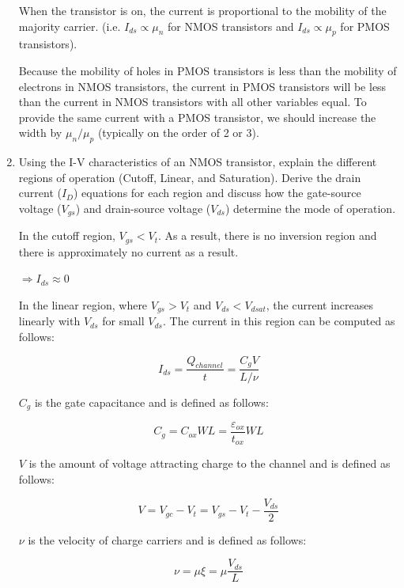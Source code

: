 \documentclass[fleqn]{article}
\begin{document}
\begin{enumerate}
		When the transistor is on, the current is proportional to the mobility of the majority carrier. (i.e. $I_{ds} \propto \mu_n$ for NMOS transistors and $I_{ds} \propto \mu_p$ for PMOS transistors).
		
		Because the mobility of holes in PMOS transistors is less than the mobility of electrons in NMOS transistors, the current in PMOS transistors will be less than the current in NMOS transistors with all other variables equal. To provide the same current with a PMOS transistor, we should increase the width by $\mu_n/\mu_p$ (typically on the order of 2 or 3).
		
		\item Using the I-V characteristics of an NMOS transistor, explain the different regions of operation (Cutoff, Linear, and Saturation). Derive the drain current ($I_D$) equations for each region and discuss how the gate-source voltage ($V_{gs}$) and drain-source voltage ($V_{ds}$) determine the mode of operation. 

		In the cutoff region, $V_{gs} < V_t$. As a result, there is no inversion region and there is approximately no current as a result.
		
		$\Rightarrow I_{ds} \approx 0$
		
		In the linear region, where $V_{gs} > V_t$ and $V_{ds} < V_{dsat}$, the current increases linearly with $V_{ds}$ for small $V_{ds}$. The current in this region can be computed as follows:
		
		\begin{equation*}		
			I_{ds} = \frac{Q_{channel}}{t} = \frac{C_gV}{L/\nu}
		\end{equation*}
		
		$C_g$ is the gate capacitance and is defined as follows:
		
		\begin{equation*}
			C_g = C_{ox}WL = \frac{\varepsilon_{ox}}{t_{ox}}WL
		\end{equation*}
		
		$V$ is the amount of voltage attracting charge to the channel and is defined as follows:
		
		\begin{equation*}
			V = V_{gc} - V_t = V_{gs} - V_t - \frac{V_{ds}}{2}
		\end{equation*}
		
		$\nu$ is the velocity of charge carriers and is defined as follows:
		
		\begin{equation*}
			\nu = \mu\xi = \mu\frac{V_{ds}}{L}
		\end{equation*}
		

\end{enumerate}
\end{document}
